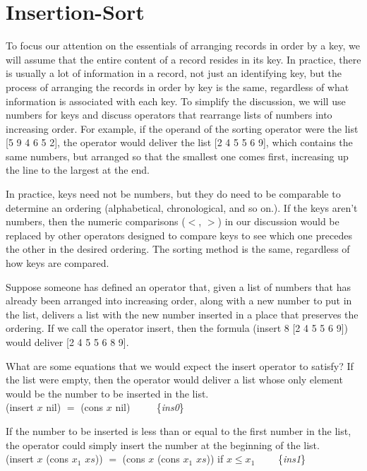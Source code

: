 \section{Insertion-Sort}
\label{sec:insertion-sort}

To focus our attention on the essentials of
arranging records in order by a key, we will
assume that the entire content of a record
resides in its key.
In practice, there is usually a lot of information
in a record, not just an identifying key,
but the process of arranging the records
in order by key is the same, regardless
of what information is associated with each key.
To simplify the discussion,
we will use numbers for keys
and discuss operators that rearrange lists
of numbers into increasing order.
For example, if the operand of the sorting
operator were the list \textsf{[5 9 4 6 5 2]},
the operator would deliver the list \textsf{[2 4 5 5 6 9]},
which contains the same numbers, but arranged so
that the smallest one comes first, increasing up the
line to the largest at the end.

In practice, keys need not be numbers,
but they do need to be comparable
to determine an ordering (alphabetical, chronological, and so on.).
If the keys aren't numbers,
then the numeric comparisons
($<$, $>$) in our discussion would be replaced by
other operators designed to compare
keys to see which one precedes the other
in the desired ordering.
The sorting method is the same, regardless
of how keys are compared.

Suppose someone has defined an operator that,
given a list of numbers that has
already been arranged into increasing order,
along with a new number to put in the list,
delivers a list with the new number inserted
in a place that preserves the ordering.
If we call the operator \textsf{insert}, then
the formula \textsf{(insert 8 [2 4 5 5 6 9])} would
deliver \textsf{[2 4 5 5 6 8 9]}.

What are some equations that we would expect
the insert operator to satisfy?
If the list were empty, then the operator
would deliver a list whose only element would
be the number to be inserted in the list.
\vspace{2mm}\\
\hspace*{5mm}\textsf{(insert $x$ nil) $=$ (cons $x$ nil)} ~~~~ \{\emph{ins0}\}
\vspace{2mm}

If the number to be inserted is less than or equal to the
first number in the list, the operator could simply
insert the number at the beginning of the list.
\vspace{2mm}\\
\hspace*{5mm}\textsf{(insert $x$ (cons $x_1$ $xs$)) $=$ (cons $x$ (cons $x_1$ $xs$))} if $x \le x_1$ ~~~~\{\emph{ins1}\}
\vspace{2mm}

